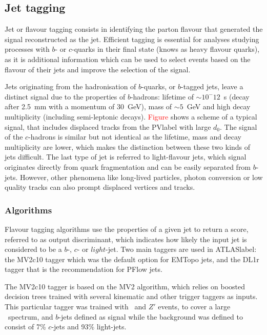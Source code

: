 \subsection{Jet tagging}

Jet or flavour tagging consists in identifying the parton flavour that generated the signal reconstructed as the jet. Efficient tagging is essential for analyses studying processes with $b$- or $c$-quarks in their final state (knows as heavy flavour quarks), as it is additional information which can be used to select events based on the flavour of their jets and improve the selection of the signal.

Jets originating from the hadronisation of $b$-quarks, or $b$-tagged jets, leave a distinct signal due to the properties of $b$-hadrons: lifetime of $\sim 10^-12$~s (decay after 2.5~mm with a momentum of 30~GeV), mass of $\sim 5$~GeV and high decay multiplicity (including semi-leptonic decays). \textcolor{red}{Figure} shows a scheme of a typical signal, that includes displaced tracks from the \acrshort{PVlabel} with large $d_0$.
The signal of the $c$-hadrons is similar but not identical as the lifetime, mass and decay multiplicity are lower, which makes the distinction between these two kinds of jets difficult. The last type of jet is referred to light-flavour jets, which signal originates directly from quark fragmentation and can be easily separated from $b$-jets. However, other phenomena like long-lived particles, photon conversion or low quality tracks can also prompt displaced vertices and tracks.

\subsubsection{Algorithms}

Flavour tagging algorithms use the properties of a given jet to return a score, referred to as output discriminant, which indicates how likely the input jet is considered to be a $b$-, $c$- or $light$-jet. Two main taggers are used in \acrshort{ATLASlabel}: the MV2c10 tagger which was the default option for EMTopo jets, and the DL1r tagger that is the recommendation for PFlow jets.

The MV2c10 tagger  %
is based on the MV2 algorithm, which relies on boosted decision trees trained with several kinematic and other trigger taggers as inputs. This particular tagger was trained with \ttbar\ and $Z'$ events, to cover a large \pT\ spectrum, and $b$-jets defined as signal while the background was defined to consist of 7\% $c$-jets and 93\% light-jets.

